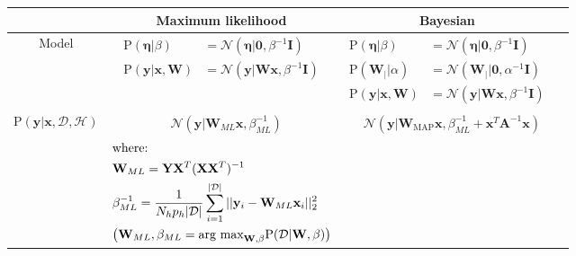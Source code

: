 	
	\begin{table}[ht]
		\centering 
		\small 
		\begin{tabular}{|c|c|c|c|}
			\hline  & Maximum likelihood & Bayesian \\ 
			\hline Model & 	$\begin{aligned}
			\text{P}(\boldsymbol{\eta}| \beta) &= \mathcal{N}(\boldsymbol{\eta}|\mathbf{0},\beta^{-1}\mathbf{I})\\
			\text{P}(\mathbf{y}|\mathbf{x}, \mathbf{W}) &=  \mathcal{N}(\mathbf{y}| \mathbf{W}\mathbf{x},\beta^{-1}\mathbf{I})
			\end{aligned}$  & 	$\begin{aligned} 
			\text{P}(\boldsymbol{\eta}| \beta) &= \mathcal{N}(\boldsymbol{\eta}|\mathbf{0},\beta^{-1}\mathbf{I})\\
			\text{P}(\mathbf{W}_{|}| \alpha) & = \mathcal{N}(\mathbf{W}_{|}|\mathbf{0},\alpha^{-1}\mathbf{I})\\
			\text{P}(\mathbf{y}|\mathbf{x}, \mathbf{W}) &=  \mathcal{N}(\mathbf{y}| \mathbf{W}\mathbf{x},\beta^{-1}\mathbf{I})
			\end{aligned}$ \\ 
			
			\hline $\text{P}(\mathbf{y}|\mathbf{x}, \mathcal{D},\mathcal{H})$ 
			& $\begin{aligned} &\mathcal{N}(\mathbf{y}|\mathbf{W}_{ML}\mathbf{x},\beta^{-1}_{ML} ) \end{aligned}$
			
			& $\begin{aligned} &\mathcal{N}(\mathbf{y}|\mathbf{W}_{\text{MAP}}\mathbf{x},\beta^{-1}_{ML} + \mathbf{x}^{T}\mathbf{A}^{-1}\mathbf{x} ) \end{aligned}$\\
			  
			  &$\begin{aligned}
					&\text{where:}\\
				  	&\mathbf{W}_{ML} = \mathbf{Y}\mathbf{X}^T(\mathbf{X} \mathbf{X}^T)^{-1}\\
				  	&\beta_{ML}^{-1} = \frac{1}{N_hp_h|\mathcal{D}|}\sum_{i=1}^{|\mathcal{D}|}||\mathbf{y}_i - \mathbf{W}_{ML}\mathbf{x}_i||^2_2 \\
				  	&\big{(} \mathbf{W}_{ML}, \beta_{ML} = \text{arg max}_{\mathbf{W},\beta}\text{P}(\mathcal{D}|\mathbf{W},\beta)\big{)}
			  \end{aligned}$ 
			  

\end{tabular}
\end{table}

